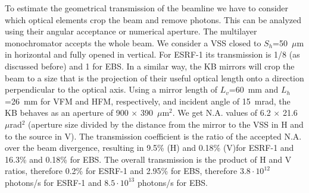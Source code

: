 \documentclass{iucr}              %
\newcommand{\todo}[1]{{\color{red}[TODO: "#1'']}}
\begin{document}
To estimate the geometrical transmission of the beamline we have to consider which optical elements crop the beam and remove photons. This can be analyzed using their angular acceptance or numerical aperture. The multilayer monochromator accepts the whole beam. We consider a VSS closed to $S_h$=50~$\mu$m in horizontal and fully opened in vertical. For ESRF-1 its transmission is 1/8 (as discussed before) and 1 for EBS. In a similar way, the KB mirrors will crop the beam to a size that is the projection of their useful optical length onto a direction perpendicular to the optical axis. Using a mirror length of $L_v$=60~mm and $L_h$=26~mm for VFM and HFM, respectively, and incident angle of 15~mrad, the KB behaves as an aperture of 900 $\times$ 390~$\mu$m$^2$. We get N.A. values of 6.2 $\times$ 21.6~$\mu$rad$^2$ (aperture size divided by the distance from the mirror to the VSS in H and to the source in V). The transmission coefficient is the ratio of the accepted N.A. over the beam divergence, resulting in 9.5\% (H) and 0.18\% (V)for ESRF-1 and 16.3\% and 0.18\% for EBS. The overall transmission is the product of H and V ratios, therefore 0.2\% for ESRF-1 and 2.95\% for EBS, therefore $3.8\cdot10^{12}$ photons/s for ESRF-1 and $8.5\cdot10^{13}$ photons/s for EBS. 
\end{document}
